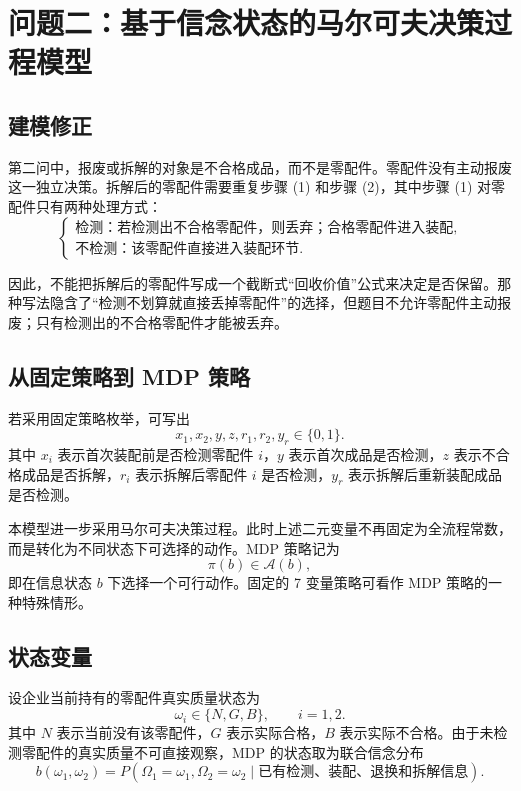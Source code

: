 
\section{问题二：基于信念状态的马尔可夫决策过程模型}

\subsection{建模修正}

第二问中，报废或拆解的对象是不合格成品，而不是零配件。零配件没有主动报废这一独立决策。拆解后的零配件需要重复步骤 (1) 和步骤 (2)，其中步骤 (1) 对零配件只有两种处理方式：
\[
\begin{cases}
\text{检测：若检测出不合格零配件，则丢弃；合格零配件进入装配},\\
\text{不检测：该零配件直接进入装配环节}.
\end{cases}
\]

因此，不能把拆解后的零配件写成一个截断式“回收价值”公式来决定是否保留。那种写法隐含了“检测不划算就直接丢掉零配件”的选择，但题目不允许零配件主动报废；只有检测出的不合格零配件才能被丢弃。

\subsection{从固定策略到 MDP 策略}

若采用固定策略枚举，可写出
\[
x_1,x_2,y,z,r_1,r_2,y_r\in\{0,1\}.
\]
其中 \(x_i\) 表示首次装配前是否检测零配件 \(i\)，\(y\) 表示首次成品是否检测，\(z\) 表示不合格成品是否拆解，\(r_i\) 表示拆解后零配件 \(i\) 是否检测，\(y_r\) 表示拆解后重新装配成品是否检测。

本模型进一步采用马尔可夫决策过程。此时上述二元变量不再固定为全流程常数，而是转化为不同状态下可选择的动作。MDP 策略记为
\[
\pi(b)\in\mathcal A(b),
\]
即在信息状态 \(b\) 下选择一个可行动作。固定的 7 变量策略可看作 MDP 策略的一种特殊情形。

\subsection{状态变量}

设企业当前持有的零配件真实质量状态为
\[
\omega_i\in\{N,G,B\},\qquad i=1,2.
\]
其中 \(N\) 表示当前没有该零配件，\(G\) 表示实际合格，\(B\) 表示实际不合格。由于未检测零配件的真实质量不可直接观察，MDP 的状态取为联合信念分布
\[
b(\omega_1,\omega_2)
=
P(\Omega_1=\omega_1,\Omega_2=\omega_2\mid \text{已有检测、装配、退换和拆解信息}).
\]

